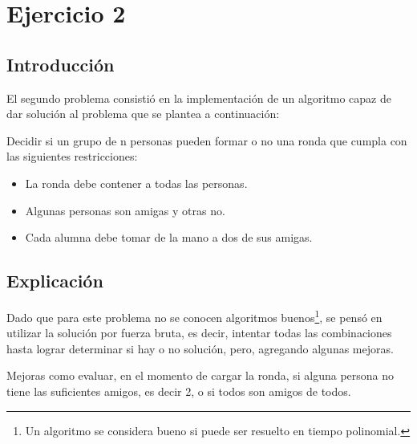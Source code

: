 \section{Ejercicio 2}

\subsection{Introducción}
\label{introej2}
	El segundo problema consistió en la implementación de un algoritmo capaz de dar solución al problema que se plantea a continuación:

	 Decidir si un grupo de n personas pueden formar o no una ronda que cumpla con las siguientes restricciones:
	\begin{itemize}
	      \item La ronda debe contener a todas las personas.
	      \item Algunas personas son amigas y otras no. 
	      \item Cada alumna debe tomar de la mano a dos de sus amigas.
	 
	\end{itemize}

	
\subsection{Explicación}
	Dado que para este problema no se conocen algoritmos buenos\footnote{Un algoritmo se considera bueno si puede ser resuelto en tiempo polinomial.},
	se pensó en utilizar la solución por fuerza bruta, es decir, intentar todas las combinaciones hasta lograr determinar si hay o no solución, pero, agregando 
	algunas mejoras.

	Mejoras como evaluar, en el momento de cargar la ronda, si alguna persona no tiene las suficientes amigos, es decir 2, o si todos son amigos de todos.	

